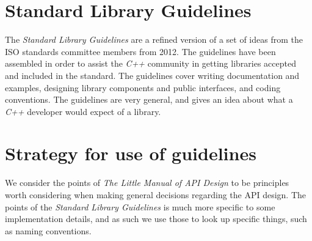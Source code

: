 \section{Standard Library Guidelines}
The \textit{Standard Library Guidelines} are a refined version of a set of ideas from the ISO standards committee members from 2012. The guidelines have been assembled in order to assist the \textit{C++} community in getting libraries accepted and included in the standard. The guidelines cover writing documentation and examples, designing library components and public interfaces, and coding conventions. The guidelines are very general, and gives an idea about what a \textit{C++} developer would expect of a library.

\section{Strategy for use of guidelines}
We consider the points of \textit{The Little Manual of API Design} to be principles worth considering when making general decisions regarding the API design. The points of the \textit{Standard Library Guidelines} is much more specific to some implementation details, and as such we use those to look up specific things, such as naming conventions.


